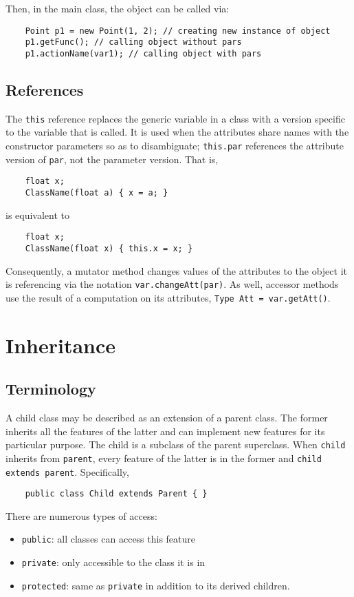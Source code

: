 \documentclass[letterpaper, openany, justified]{tufte-book}
\newcommand{\cd}[1]{\lstinline{#1}}
\begin{document}
\begin{fullwidth}
Then, in the main class, the object can be called via:
\begin{lstlisting}
    Point p1 = new Point(1, 2); // creating new instance of object
    p1.getFunc(); // calling object without pars
    p1.actionName(var1); // calling object with pars
\end{lstlisting}

\section{References}
The \cd{this} reference replaces the generic variable in a class with a version specific to the variable that is called. It is used when the attributes share names with the constructor parameters so as to disambiguate; \cd{this.par} references the attribute version of \cd{par}, not the parameter version. That is,
\begin{lstlisting}
    float x;
    ClassName(float a) { x = a; }
\end{lstlisting}
is equivalent to
\begin{lstlisting}
    float x;
    ClassName(float x) { this.x = x; }
\end{lstlisting}
Consequently, a mutator method changes values of the attributes to the object it is referencing via the notation \cd{var.changeAtt(par)}. As well, accessor methods use the result of a computation on its attributes, \cd{Type Att = var.getAtt()}.


\chapter{Inheritance}

\section{Terminology}
A child class may be described as an extension of a parent class. The former inherits all the features of the latter and can implement new features for its particular purpose. The child is a subclass of the parent superclass. When \cd{child} inherits from \cd{parent}, every feature of the latter is in the former and \cd{child extends parent}. Specifically,
\begin{lstlisting}
    public class Child extends Parent { }
\end{lstlisting}
There are numerous types of access:
\begin{itemize}
    \item \cd{public}: all classes can access this feature
    \item \cd{private}: only accessible to the class it is in
    \item \cd{protected}: same as \cd{private} in addition to its derived children.
\end{itemize}


\end{fullwidth}
\end{document}
